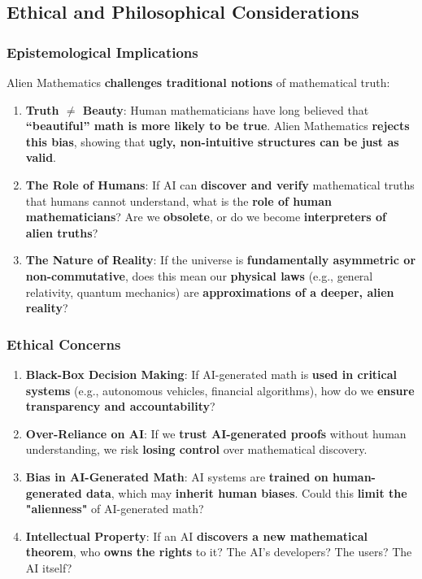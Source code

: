 \documentclass[11pt, a4paper]{article}
\begin{document}
\subsection{Ethical and Philosophical Considerations}
\subsubsection{Epistemological Implications}
Alien Mathematics \textbf{challenges traditional notions} of mathematical truth:
\begin{enumerate}
    \item \textbf{Truth $\neq$ Beauty}: Human mathematicians have long believed that \textbf{``beautiful'' math is more likely to be true}. Alien Mathematics \textbf{rejects this bias}, showing that \textbf{ugly, non-intuitive structures can be just as valid}.
    \item \textbf{The Role of Humans}: If AI can \textbf{discover and verify} mathematical truths that humans cannot understand, what is the \textbf{role of human mathematicians}? Are we \textbf{obsolete}, or do we become \textbf{interpreters of alien truths}?
    \item \textbf{The Nature of Reality}: If the universe is \textbf{fundamentally asymmetric or non-commutative}, does this mean our \textbf{physical laws} (e.g., general relativity, quantum mechanics) are \textbf{approximations of a deeper, alien reality}?
\end{enumerate}

\subsubsection{Ethical Concerns}
\begin{enumerate}
    \item \textbf{Black-Box Decision Making}: If AI-generated math is \textbf{used in critical systems} (e.g., autonomous vehicles, financial algorithms), how do we \textbf{ensure transparency and accountability}?
    \item \textbf{Over-Reliance on AI}: If we \textbf{trust AI-generated proofs} without human understanding, we risk \textbf{losing control} over mathematical discovery.
    \item \textbf{Bias in AI-Generated Math}: AI systems are \textbf{trained on human-generated data}, which may \textbf{inherit human biases}. Could this \textbf{limit the "alienness"} of AI-generated math?
    \item \textbf{Intellectual Property}: If an AI \textbf{discovers a new mathematical theorem}, who \textbf{owns the rights} to it? The AI’s developers? The users? The AI itself?
\end{enumerate}
\end{document}
